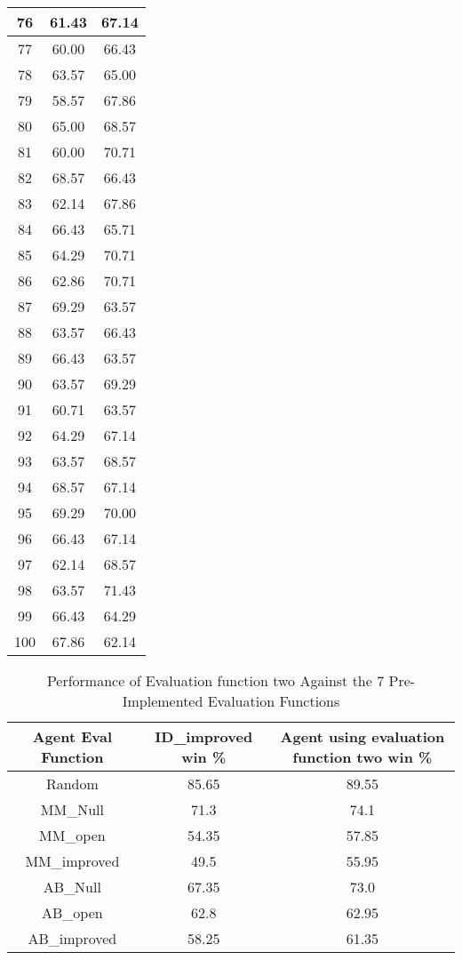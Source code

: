 \documentclass[11pt]{article}
\begin{document}
\begin{longtable}[c]{| c | c |c |}
76 & 61.43 & 67.14 \\ \hline
77 & 60.00 & 66.43 \\ \hline
78 & 63.57 & 65.00 \\ \hline
79 & 58.57 & 67.86 \\ \hline
80 & 65.00 & 68.57 \\ \hline
81 & 60.00 & 70.71 \\ \hline
82 & 68.57 & 66.43 \\ \hline
83 & 62.14 & 67.86 \\ \hline
84 & 66.43 & 65.71 \\ \hline
85 & 64.29 & 70.71 \\ \hline
86 & 62.86 & 70.71 \\ \hline
87 & 69.29 & 63.57 \\ \hline
88 & 63.57 & 66.43 \\ \hline
89 & 66.43 & 63.57 \\ \hline
90 & 63.57 & 69.29 \\ \hline
91 & 60.71 & 63.57 \\ \hline
92 & 64.29 & 67.14 \\ \hline
93 & 63.57 & 68.57 \\ \hline
94 & 68.57 & 67.14 \\ \hline
95 & 69.29 & 70.00 \\ \hline
96 & 66.43 & 67.14 \\ \hline
97 & 62.14 & 68.57 \\ \hline
98 & 63.57 & 71.43 \\ \hline
99 & 66.43 & 64.29 \\ \hline
100 & 67.86 & 62.14 \\ \hline
\end{longtable}

\begin{table}[h!]
\caption{Performance of Evaluation function two Against the 7 Pre-Implemented Evaluation Functions}
\centering
\begin{tabular}{||c | c| c||} 
 \hline
Agent Eval Function & ID\_improved win \% & Agent using evaluation function two win \% \\ \hline
Random & 85.65 & 89.55 \\ \hline
MM\_Null & 71.3 & 74.1 \\ \hline
MM\_open & 54.35 & 57.85 \\ \hline
MM\_improved & 49.5 & 55.95 \\ \hline
AB\_Null & 67.35 & 73.0 \\ \hline
AB\_open & 62.8 & 62.95 \\ \hline
AB\_improved & 58.25 & 61.35 \\ \hline
\end{tabular}
\label{eval_fun2}
\end{table}
\end{document}
